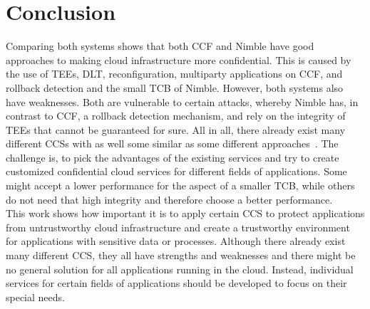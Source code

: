 \section{Conclusion}
Comparing both systems shows that both CCF and Nimble have good approaches to making cloud infrastructure more confidential. This is caused by the use of TEEs, DLT, reconfiguration, multiparty applications on CCF, and rollback detection and the small TCB of Nimble. However, both systems also have weaknesses. Both are vulnerable to certain attacks, whereby Nimble has, in contrast to CCF, a rollback detection mechanism, and rely on the integrity of TEEs that cannot be guaranteed for sure.
All in all, there already exist many different CCSs with as well some similar as some different approaches~\cite{rote, narrator, lcm}. The challenge is, to pick the advantages of the existing services and try to create customized confidential cloud services for different fields of applications. Some might accept a lower performance for the aspect of a smaller TCB, while others do not need that high integrity and therefore choose a better performance.\\
 This work shows how important it is to apply certain CCS to protect applications from untrustworthy cloud infrastructure and create a trustworthy environment for applications with sensitive data or processes. Although there already exist many different CCS, they all have strengths and weaknesses and there might be no general solution for all applications running in the cloud. Instead, individual services for certain fields of applications should be developed to focus on their special needs.